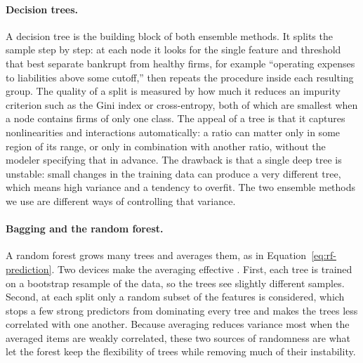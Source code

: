 \documentclass[12pt,a4paper]{article}
\begin{document}
\paragraph{Decision trees.} A decision tree is the building block of both
ensemble methods. It splits the sample step by step: at each node it looks for
the single feature and threshold that best separate bankrupt from healthy
firms, for example ``operating expenses to liabilities above some cutoff,''
then repeats the procedure inside each resulting group. The quality of a split
is measured by how much it reduces an impurity criterion such as the Gini
index or cross-entropy, both of which are smallest when a node contains firms
of only one class. The appeal of a tree is that it captures nonlinearities and
interactions automatically: a ratio can matter only in some region of its
range, or only in combination with another ratio, without the modeler
specifying that in advance. The drawback is that a single deep tree is
unstable: small changes in the training data can produce a very different
tree, which means high variance and a tendency to overfit. The two ensemble
methods we use are different ways of controlling that variance.

\paragraph{Bagging and the random forest.} A random forest grows many trees
and averages them, as in Equation~\eqref{eq:rf-prediction}. Two devices make
the averaging effective \citep{breiman2001}. First, each tree is trained on a
bootstrap resample of the data, so the trees see slightly different samples.
Second, at each split only a random subset of the features is considered, which
stops a few strong predictors from dominating every tree and makes the trees
less correlated with one another. Because averaging reduces variance most when
the averaged items are weakly correlated, these two sources of randomness are
what let the forest keep the flexibility of trees while removing much of their
instability.
\end{document}
